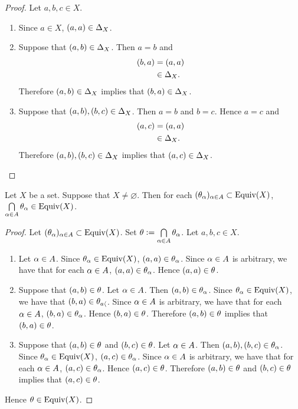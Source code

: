 \begin{proof}
	Let $a,b, c \in X$. 
	\begin{enumerate}
		\item Since $a \in X$, $(a,a) \in \Delta_X$.
		\item Suppose that $(a,b) \in \Delta_X$. Then $a = b$ and
		\begin{align*}
			(b,a)
			& = (a, a) \\
			& \in \Delta_X. 
		\end{align*} 
		Therefore $(a,b) \in \Delta_X$ implies that $(b,a) \in \Delta_X$.
		\item Suppose that $(a,b), (b, c) \in \Delta_X$. Then $a = b$ and $b = c$. Hence $a = c$ and 
		\begin{align*}
			(a,c)
			& = (a, a) \\
			& \in \Delta_X. 
		\end{align*} 
		Therefore $(a,b), (b,c) \in \Delta_X$ implies that $(a,c) \in \Delta_X$.
	\end{enumerate}
\end{proof}

\begin{ex}
	Let $X$ be a set. Suppose that $X \neq \varnothing$. Then for each $(\theta_{\alpha})_{\alpha \in A} \subset \operatorname*{\text{Equiv}}(X)$, $\bigcap\limits_{\alpha \in A} \theta_{\alpha} \in \operatorname*{\text{Equiv}}(X)$. 
\end{ex}

\begin{proof}
	Let $(\theta_{\alpha})_{\alpha \in A} \subset \operatorname*{\text{Equiv}}(X)$. Set $\theta \vcentcolon= \bigcap\limits_{\alpha \in A} \theta_{\alpha}$. Let $a,b,c \in X$. 
	\begin{enumerate}
		\item Let $\alpha \in A$. Since $\theta_{\alpha} \in \operatorname*{\text{Equiv}}(X)$, $(a, a) \in \theta_{\alpha}$. Since $\alpha \in A$ is arbitrary, we have that for each $\alpha \in A$, $(a,a) \in \theta_{\alpha}$. Hence $(a, a) \in \theta$. 
		\item Suppose that $(a,b) \in \theta$. Let $\alpha \in A$. Then $(a,b) \in \theta_{\alpha}$. Since $\theta_{\alpha} \in \operatorname*{\text{Equiv}}(X)$, we have that $(b,a) \in \theta_{a\langle}$. Since $\alpha \in A$ is arbitrary, we have that for each $\alpha \in A$, $(b,a) \in \theta_{\alpha}$. Hence $(b, a) \in \theta$. Therefore $(a,b) \in \theta$ implies that $(b,a) \in \theta$.  
		\item Suppose that $(a,b) \in \theta$ and $(b,c) \in \theta$. Let $\alpha \in A$. Then $(a,b), (b,c) \in \theta_{\alpha}$. Since $\theta_{\alpha} \in \operatorname*{\text{Equiv}}(X)$, $(a,c) \in \theta_{\alpha}$. Since $\alpha \in A$ is arbitrary, we have that for each $\alpha \in A$, $(a,c) \in \theta_{\alpha}$. Hence $(a,c) \in \theta$. Therefore $(a,b) \in \theta$ and $(b,c) \in \theta$ implies that $(a,c) \in \theta$.  
	\end{enumerate}
	Hence $\theta \in \operatorname*{\text{Equiv}}(X)$. 
\end{proof}

